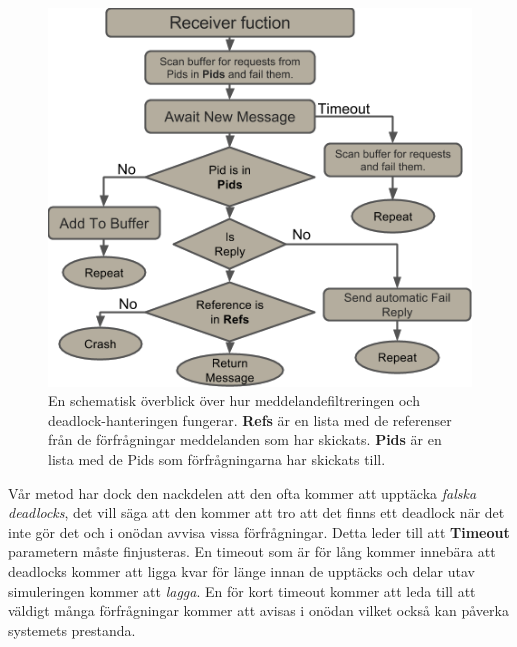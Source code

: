 \begin{figure}
\includegraphics[scale=0.8]{Figures/receiver.png}
\caption{En schematisk överblick över hur meddelandefiltreringen och deadlock-hanteringen fungerar. \textbf{Refs} är en lista med de referenser från de förfrågningar meddelanden som har skickats.  \textbf{Pids} är en lista med de Pids som förfrågningarna har skickats till.}
\label{fig:receiver}
\end{figure}

Vår metod har dock den nackdelen att den ofta kommer att upptäcka \emph{falska deadlocks}, det vill säga att den kommer att tro att det finns ett deadlock när det inte gör det och i onödan avvisa vissa förfrågningar. Detta leder till att \textbf{Timeout} parametern måste finjusteras. En timeout som är för lång kommer innebära att deadlocks kommer att ligga kvar för länge innan de upptäcks och delar utav simuleringen kommer att  \emph{lagga}. En för kort timeout kommer att leda till att väldigt många förfrågningar kommer att avisas i onödan vilket också kan påverka systemets prestanda.
























